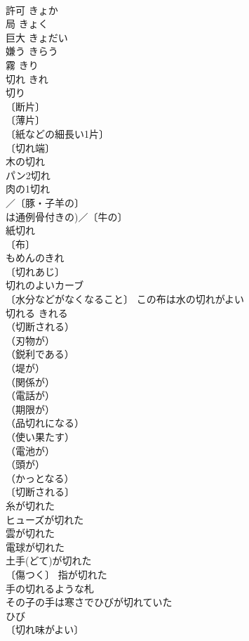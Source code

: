 \documentclass[8pt]{extreport}
\begin{document}
\begin{CJK}{UTF8}{min}
\\	許可	きょか	
\\	局	きょく	
\\	巨大	きょだい	
\\	嫌う	きらう	
\\	霧	きり	
\\	切れ	きれ	
\\	切り 
\\	〔断片〕
\\	〔薄片〕
\\	〔紙などの細長い1片〕
\\	〔切れ端〕
\\	木の切れ 
\\	パン2切れ 
\\	肉の1切れ 
\\	／〔豚・子羊の〕
\\	は通例骨付きの)／〔牛の〕
\\	紙切れ 
\\	〔布〕
\\	もめんのきれ 
\\	〔切れあじ〕 
\\	切れのよいカーブ 
\\	〔水分などがなくなること〕 この布は水の切れがよい 
\\	切れる	きれる	
\\	（切断される）
\\	（刃物が）
\\	（鋭利である）
\\	（堤が）
\\	（関係が）
\\	（電話が）
\\	（期限が）
\\	（品切れになる）
\\	（使い果たす）
\\	（電池が）
\\	（頭が）
\\	（かっとなる）
\\	〔切断される〕
\\	糸が切れた 
\\	ヒューズが切れた 
\\	雲が切れた 
\\	電球が切れた 
\\	土手(どて)が切れた 
\\	〔傷つく〕 指が切れた 
\\	手の切れるような札 
\\	その子の手は寒さでひびが切れていた 
\\	ひび　
\\	〔切れ味がよい〕

\end{CJK}
\end{document}
